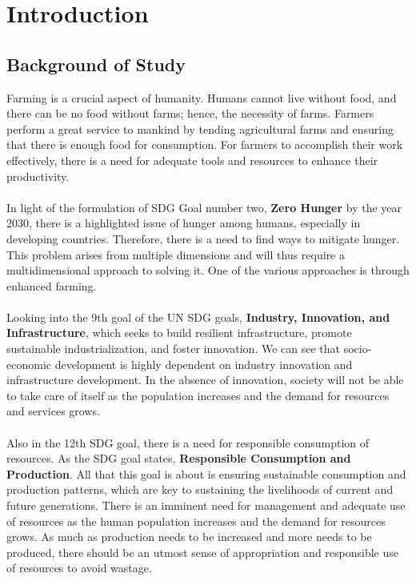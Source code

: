 \documentclass[12pt, a4paper]{article}
\begin{document}
\newpage


\tableofcontents
\newpage
\listoffigures
\newpage
{}
\section{Introduction}
\subsection{Background of Study}
Farming is a crucial aspect of humanity. Humans cannot live without food, and there can be no food without farms; hence, the necessity of farms. Farmers perform a great service to mankind by tending agricultural farms and ensuring that there is enough food for consumption. For farmers to accomplish their work effectively, there is a need for adequate tools and resources to enhance their productivity.\\
\\
In light of the formulation of SDG Goal number two, \textbf{Zero Hunger} by the year 2030\cite{unhunger}, there is a highlighted issue of hunger among humans, especially in developing countries. Therefore, there is a need to find ways to mitigate hunger. This problem arises from multiple dimensions and will thus require a multidimensional approach to solving it. One of the various approaches is through enhanced farming.\\
\\
Looking into the 9th goal of the UN SDG goals, \textbf{Industry, Innovation, and Infrastructure}, which seeks to build resilient infrastructure, promote sustainable industrialization, and foster innovation\cite{uninnovation}. We can see that socio-economic development is highly dependent on industry innovation and infrastructure development. In the absence of innovation, society will not be able to take care of itself as the population increases and the demand for resources and services grows.\\
\\
Also in the 12th SDG goal, there is a need for responsible consumption of resources. As the SDG goal states, \textbf{Responsible Consumption and Production}. All that this goal is about is ensuring sustainable consumption and production patterns, which are key to sustaining the livelihoods of current and future generations\cite{unresponsible}. There is an imminent need for management and adequate use of resources as the human population increases and the demand for resources grows. As much as production needs to be increased and more needs to be produced, there should be an utmost sense of appropriation and responsible use of resources to avoid wastage.\\
\end{document}
